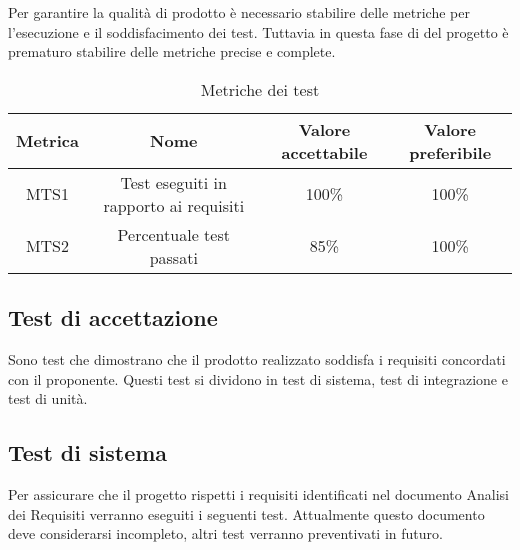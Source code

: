\documentclass[../piano_di_qualifica.tex]{subfiles}
\begin{document}
Per garantire la qualità di prodotto è necessario stabilire delle metriche per l’esecuzione e il soddisfacimento dei test. Tuttavia in questa fase di del progetto è prematuro stabilire delle metriche precise e complete.


\begin{table}[!ht]
	\centering
	\begin{tabular}{|c|c|c|c|}
		\hline
		\rowcolor{lightgray}
		\textbf{Metrica} & \textbf{Nome}                          & \textbf{Valore accettabile} & \textbf{Valore preferibile} \\
		\hline
		MTS1             & Test eseguiti in rapporto ai requisiti & 100\%                       & 100\%                       \\
		\hline
		MTS2             & Percentuale test passati               & 85\%                        & 100\%                       \\
		\hline
	\end{tabular}
	\caption{Metriche dei test}
\end{table}

\subsection{Test di accettazione}%
\label{sub:test_accett}
Sono test che dimostrano che il prodotto realizzato soddisfa i requisiti concordati con il proponente.
Questi test si dividono in test di sistema, test di integrazione e test di unità.

\subsection{Test di sistema}%
\label{sub:test_sist}
Per assicurare che il progetto rispetti i requisiti identificati nel documento Analisi dei Requisiti verranno eseguiti i seguenti test. Attualmente questo documento deve considerarsi incompleto, altri test verranno preventivati in futuro. \par
\end{document}

